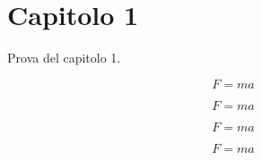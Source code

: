 \chapter{Capitolo 1}


Prova del capitolo 1.

\begin{equation}
    F = ma
\end{equation}


\begin{equation}
    F = ma
\end{equation}


\begin{equation}
    F = ma
\end{equation}


\begin{equation}
    F = ma
\end{equation}



